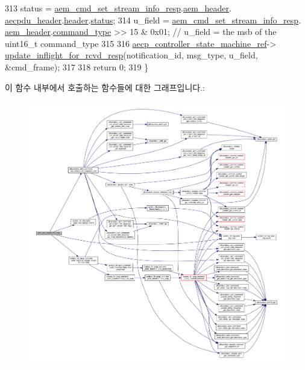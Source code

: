 \begin{DoxyCode}
313     status = \hyperlink{classavdecc__lib_1_1stream__output__descriptor__imp_aa222e1112a2252bbff62b2eb82d5faad}{aem\_cmd\_set\_stream\_info\_resp}.\hyperlink{structjdksavdecc__aem__command__set__stream__info__response_ae1e77ccb75ff5021ad923221eab38294}{aem\_header}.
      \hyperlink{structjdksavdecc__aecpdu__aem_ae8460ae179666e7ce268ed1ef33d0de3}{aecpdu\_header}.\hyperlink{structjdksavdecc__aecpdu__common_a314cacb6a61bcf18749030c0b6fb7510}{header}.\hyperlink{structjdksavdecc__aecpdu__common__control__header_ade818037fd6c985038ff29656089758d}{status};
314     u\_field = \hyperlink{classavdecc__lib_1_1stream__output__descriptor__imp_aa222e1112a2252bbff62b2eb82d5faad}{aem\_cmd\_set\_stream\_info\_resp}.
      \hyperlink{structjdksavdecc__aem__command__set__stream__info__response_ae1e77ccb75ff5021ad923221eab38294}{aem\_header}.\hyperlink{structjdksavdecc__aecpdu__aem_a07f7ee802870e9ae75f021832f59a8a9}{command\_type} >> 15 & 0x01; \textcolor{comment}{// u\_field = the msb of the uint16\_t
       command\_type}
315 
316     \hyperlink{namespaceavdecc__lib_a0b1b5aea3c0490f77cbfd9178af5be22}{aecp\_controller\_state\_machine\_ref}->
      \hyperlink{classavdecc__lib_1_1aecp__controller__state__machine_a997abd9786c330a5505e903e6443208e}{update\_inflight\_for\_rcvd\_resp}(notification\_id, msg\_type, u\_field, &cmd\_frame);
317 
318     \textcolor{keywordflow}{return} 0;
319 \}
\end{DoxyCode}


이 함수 내부에서 호출하는 함수들에 대한 그래프입니다.\+:
\nopagebreak
\begin{figure}[H]
\begin{center}
\leavevmode
\includegraphics[width=350pt]{classavdecc__lib_1_1stream__output__descriptor__imp_a37df54e12713796100b4751fa479395d_cgraph}
\end{center}
\end{figure}




